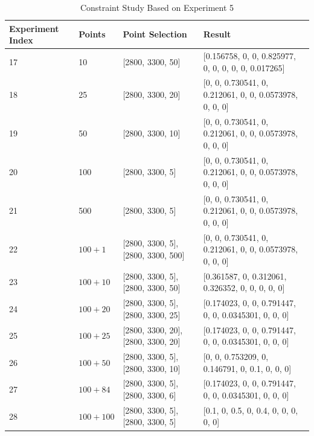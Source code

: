 \begin{table} \tiny \label{tab:3.6}
\begin{center}
\begin{tabular}{| l | l | p{3cm}  | p{6cm} |}
\hline
Experiment Index & Points & Point Selection & Result \\ \hline
17 & 10 & [2800, 3300, 50] & [0.156758, 0, 0, 0.825977, 0, 0, 0, 0, 0, 0.017265] \\ \hline
18 & 25 & [2800, 3300, 20] & [0, 0, 0.730541, 0, 0.212061, 0, 0, 0.0573978, 0, 0, 0] \\ \hline
19 & 50 & [2800, 3300, 10] & [0, 0, 0.730541, 0, 0.212061, 0, 0, 0.0573978, 0, 0, 0] \\ \hline
20 & 100 & [2800, 3300, 5] & [0, 0, 0.730541, 0, 0.212061, 0, 0, 0.0573978, 0, 0, 0] \\ \hline
21 & 500 & [2800, 3300, 5] & [0, 0, 0.730541, 0, 0.212061, 0, 0, 0.0573978, 0, 0, 0] \\ \hline	
22 & $100 + 1$ & [2800, 3300, 5], [2800, 3300, 500] & [0, 0, 0.730541, 0, 0.212061, 0, 0, 0.0573978, 0, 0, 0] \\ \hline
23 & $100 + 10$ & [2800, 3300, 5], [2800, 3300, 50] & [0.361587, 0, 0.312061, 0.326352, 0, 0, 0, 0, 0] \\ \hline
24 & $100 + 20$ & [2800, 3300, 5], [2800, 3300, 25] & [0.174023, 0, 0, 0.791447, 0, 0, 0.0345301, 0, 0, 0] \\ \hline
25 & $100 + 25$ & [2800, 3300, 20], [2800, 3300, 20] & [0.174023, 0, 0, 0.791447, 0, 0, 0.0345301, 0, 0, 0] \\ \hline
26 & $100 + 50$ & [2800, 3300, 5], [2800, 3300, 10] & [0, 0, 0.753209, 0, 0.146791, 0, 0.1, 0, 0, 0] \\ \hline
27 & $100 + 84$ & [2800, 3300, 5], [2800, 3300, 6] & [0.174023, 0, 0, 0.791447, 0, 0, 0.0345301, 0, 0, 0] \\ \hline
28 & $100 + 100$ & [2800, 3300, 5], [2800, 3300, 5] & [0.1, 0, 0.5, 0, 0.4, 0, 0, 0, 0, 0] \\ 
\hline
\end{tabular} \\
\caption{Constraint Study Based on Experiment 5}
\end{center}
\end{table}

